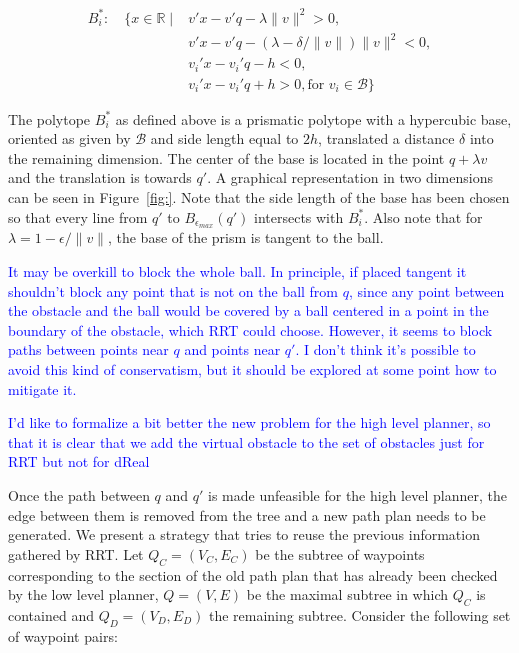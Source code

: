 \documentclass[12pt]{article}
\newcommand\fran[1]{\textcolor{blue}{#1}}
\begin{document}
\begin{equation}
    \label{eq:virtual_obst}
    \begin{split}
        B^*_i : \quad \{x \in \mathbb{R} \mid &v'x - v'q - \lambda \|v\|^2 > 0, \\
                                              &v'x - v'q - (\lambda - \delta / \|v\|) \|v\|^2 < 0, \\
                                              &v_i'x - v_i'q - h < 0, \\
                                              &v_i'x - v_i'q + h > 0, \text{for } v_i \in \mathcal{B} \}
    \end{split}
\end{equation}

The polytope $B^*_i$ as defined above is a prismatic polytope with a hypercubic base, oriented as given by $\mathcal{B}$ and side length equal to $2 h$, translated a distance $\delta$ into the remaining dimension. The center of the base is located in the point $q + \lambda v$ and the translation is towards $q'$. A graphical representation in two dimensions can be seen in Figure~\ref{fig:}. Note that the side length of the base has been chosen so that every line from $q'$ to $B_{\epsilon_{max}}(q')$ intersects with $B^*_i$. Also note that for $\lambda = 1 - \epsilon / \|v\|$, the base of the prism is tangent to the ball.

\fran{It may be overkill to block the whole ball. In principle, if placed tangent it shouldn't block any point that is not on the ball from $q$, since any point between the obstacle and the ball would be covered by a ball centered in a point in the boundary of the obstacle, which RRT could choose. However, it seems to block paths between points near $q$ and points near $q'$. I don't think it's possible to avoid this kind of conservatism, but it should be explored at some point how to mitigate it.}

\fran{I'd like to formalize a bit better the new problem for the high level planner, so that it is clear that we add the virtual obstacle to the set of obstacles just for RRT but not for dReal}

Once the path between $q$ and $q'$ is made unfeasible for the high level planner, the edge between them is removed from the tree and a new path plan needs to be generated. We present a strategy that tries to reuse the previous information gathered by RRT. Let $Q_C = (V_C, E_C)$ be the subtree of waypoints corresponding to the section of the old path plan that has already been checked by the low level planner, $Q = (V, E)$ be the maximal subtree in which $Q_C$ is contained and $Q_D = (V_D, E_D)$ the remaining subtree. Consider the following set of waypoint pairs:
\end{document}
